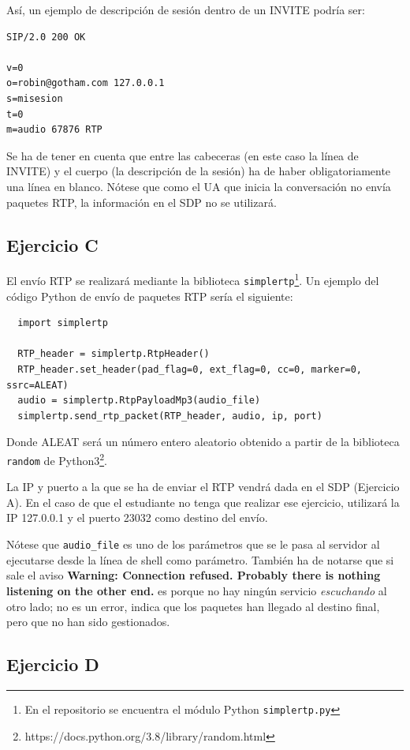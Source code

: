 \documentclass[a4paper,11pt]{article}
\begin{document}
Así, un ejemplo de descripción de sesión dentro de un INVITE podría ser:

\begin{verbatim}
SIP/2.0 200 OK

v=0
o=robin@gotham.com 127.0.0.1
s=misesion
t=0
m=audio 67876 RTP
\end{verbatim}

Se ha de tener en cuenta que entre las cabeceras (en este caso la línea de INVITE) y el cuerpo (la descripción de la sesión) ha de haber obligatoriamente una línea en blanco. Nótese que como el UA que inicia la conversación no envía paquetes RTP, la información en el SDP no se utilizará.


\subsection*{Ejercicio C}

El envío RTP se realizará mediante la biblioteca \texttt{simplertp}\footnote{En el repositorio se encuentra el módulo Python \texttt{simplertp.py}}. Un ejemplo del código Python de envío de paquetes RTP sería el siguiente:

\begin{verbatim}
  import simplertp

  RTP_header = simplertp.RtpHeader()
  RTP_header.set_header(pad_flag=0, ext_flag=0, cc=0, marker=0, ssrc=ALEAT)
  audio = simplertp.RtpPayloadMp3(audio_file)
  simplertp.send_rtp_packet(RTP_header, audio, ip, port)
\end{verbatim}

Donde ALEAT será un número entero aleatorio obtenido a partir de la biblioteca \texttt{random} de Python3\footnote{https://docs.python.org/3.8/library/random.html}.

La IP y puerto a la que se ha de enviar el RTP vendrá dada en el SDP (Ejercicio A). En el caso de que el estudiante no tenga que realizar ese ejercicio, utilizará la IP 127.0.0.1 y el puerto 23032 como destino del envío.

Nótese que \texttt{audio\_file} es uno de los parámetros que se le pasa al servidor al ejecutarse desde la línea de shell como parámetro. También ha de notarse que si sale el aviso {\bf Warning: Connection refused. Probably there is nothing listening on the other end.} es porque no hay ningún servicio \emph{escuchando} al otro lado; no es un error, indica que los paquetes han llegado al destino final, pero que no han sido gestionados.

\subsection*{Ejercicio D}
\end{document}
